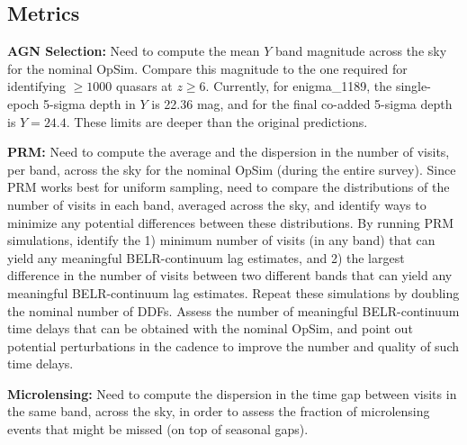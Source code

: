 \subsection{Metrics}
\label{sec:\secname:metrics}


{\bf AGN Selection:} Need to compute the mean $Y$ band magnitude
across the sky for the nominal OpSim. Compare this magnitude to the
one required for identifying $\geq1000$ quasars at $z\geq6$.
Currently, for enigma\_1189, the single-epoch 5-sigma depth in $Y$
is 22.36 mag, and for the final co-added 5-sigma depth is $Y=24.4$.
These limits are deeper than the original predictions.

{\bf PRM:} Need to compute the average and the dispersion in the
number of visits, per band, across the sky for the nominal OpSim
(during the entire survey). Since PRM works best for uniform sampling,
need to compare the distributions of the number of visits in each
band, averaged across the sky, and identify ways to minimize any
potential differences between these distributions. By running PRM
simulations, identify the 1) minimum number of visits (in any band)
that can yield any meaningful BELR-continuum lag estimates, and 2) the
largest difference in the number of visits between two different bands
that can yield any meaningful BELR-continuum lag estimates. Repeat
these simulations by doubling the nominal number of DDFs. Assess the
number of meaningful BELR-continuum time delays that can be obtained
with the nominal OpSim, and point out potential perturbations in the
cadence to improve the number and quality of such time delays.

{\bf Microlensing:} Need to compute the dispersion in the time gap
between visits in the same band, across the sky, in order to assess
the fraction of microlensing events that might be missed (on top of
seasonal gaps).



